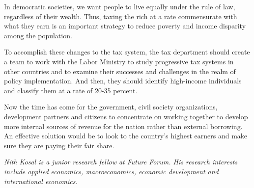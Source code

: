 \documentclass[10pt,a4paper]{letter}
\begin{document}
In democratic societies, we want people to live equally under the rule of law, regardless of their wealth. Thus, taxing the rich at a rate commensurate with what they earn is an important strategy to reduce poverty and income disparity among the population.

To accomplish these changes to the tax system, the tax department should create a team to work with the Labor Ministry to study progressive tax systems in other countries and to examine their successes and challenges in the realm of policy implementation. And then, they should identify high-income individuals and classify them at a rate of 20-35 percent. 

Now the time has come for the government, civil society organizations, development partners and citizens to concentrate on working together to develop more internal sources of revenue for the nation rather than external borrowing. An effective solution would be to look to the country's highest earners and make sure they are paying their fair share.


\textit{Nith Kosal is a junior research fellow at Future Forum. His research interests include applied economics, macroeconomics, economic development and international economics.
}
\end{document}
